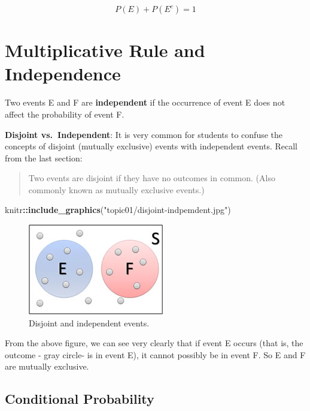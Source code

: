 \documentclass[
]{book}
\newenvironment{Shaded}{\begin{snugshade}}{\end{snugshade}}
\newcommand{\FunctionTok}[1]{\textcolor[rgb]{0.13,0.29,0.53}{\textbf{#1}}}
\newcommand{\NormalTok}[1]{#1}
\newcommand{\SpecialCharTok}[1]{\textcolor[rgb]{0.81,0.36,0.00}{\textbf{#1}}}
\newcommand{\StringTok}[1]{\textcolor[rgb]{0.31,0.60,0.02}{#1}}
\begin{document}
\[P(E) + P(E^c) = 1\]

\hypertarget{multiplicative-rule-and-independence}{%
\section{Multiplicative Rule and Independence}\label{multiplicative-rule-and-independence}}

Two events E and F are \textbf{independent} if the occurrence of event E does not affect the probability of event F.

\textbf{Disjoint vs.~Independent}: It is very common for students to confuse the concepts of disjoint (mutually exclusive) events with independent events. Recall from the last section:

\begin{quote}
Two events are disjoint if they have no outcomes in common. (Also commonly known as mutually exclusive events.)
\end{quote}

\begin{Shaded}
\begin{Highlighting}[]
\NormalTok{knitr}\SpecialCharTok{::}\FunctionTok{include\_graphics}\NormalTok{(}\StringTok{"topic01/disjoint{-}indpemdent.jpg"}\NormalTok{)}
\end{Highlighting}
\end{Shaded}

\begin{figure}

{\centering \includegraphics[width=0.3\linewidth]{topic01/disjoint-indpemdent} 

}

\caption{Disjoint and independent events.}\label{fig:unnamed-chunk-26}
\end{figure}

From the above figure, we can see very clearly that if event E occurs (that is, the outcome - gray circle- is in event E), it cannot possibly be in event F. So E and F are mutually exclusive.

\hypertarget{conditional-probability}{%
\subsection{Conditional Probability}\label{conditional-probability}}
\end{document}
